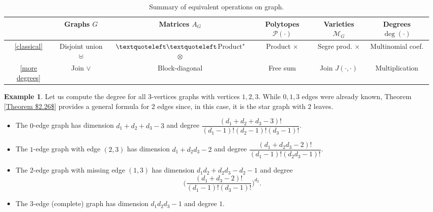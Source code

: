 \documentclass[11pt]{amsart}
\numberwithin{equation}{section}
\theoremstyle{plain}
\numberwithin{theorem}{section}
\theoremstyle{definition}
\newtheorem{example}[theorem]{Example}
\begin{document}
\begin{table}[H]
\begin{tabular}{ |c|c|c|c|c|c| } 
 \hline
 & Graphs $G$ & Matrices $A_G$ & Polytopes $\mathcal P(\cdot)$ & Varieties $\mathcal{M}_G$ & Degrees $\deg(\cdot)$\\
 \hline
 \ref{classical} & Disjoint union $\uplus$ & $\textquoteleft\textquoteleft
$Product" $\otimes$ & Product $\times$ & Segre prod. $\times$ & Multinomial coef. \\ 
 \ref{more degrees} & Join $\vee$ & Block-diagonal & Free sum & Join $J(\cdot,\cdot)$ & Multiplication \\ 
 \hline
\end{tabular}
\caption{Summary of equivalent operations on graph.}
\label{table: equivalent operations}
\end{table}

\begin{example}
\label{Example $2.28$}
Let us compute the degree for all $3$-vertices graphs with vertices $1,2,3$. While $0,1,3$ edges were already known, Theorem \ref{Theorem $2.26$} provides a general formula for $2$ edges since, in this case, it is the star graph with $2 $ leaves.
\begin{itemize}
    \item The $0$-edge graph has dimension $d_1+d_2+d_3-3$ and degree $\dfrac{(d_1+d_2+d_3-3)!}{(d_1-1)!(d_2-1)!(d_3-1)!}$.\vspace*{1mm}
    \item The $1$-edge graph with edge $(2,3)$ has dimension $d_1+d_2d_3-2$ and degree $\dfrac{(d_1+d_2d_3-2)!}{(d_1-1)!(d_2d_3-1)!}$.\vspace*{1mm}
    \item  The $2$-edge graph with missing edge $(1,3)$ has dimension $d_1d_2+d_2d_3-d_2-1$ and degree $$\bigg(\dfrac{(d_1+d_3-2)!}{(d_1-1)!(d_3-1)!}\bigg)^{d_2}.$$
    \item The $3$-edge (complete) graph has dimension $d_1d_2d_3-1$ and degree $1$.

\end{itemize}

\end{example}
\end{document}
